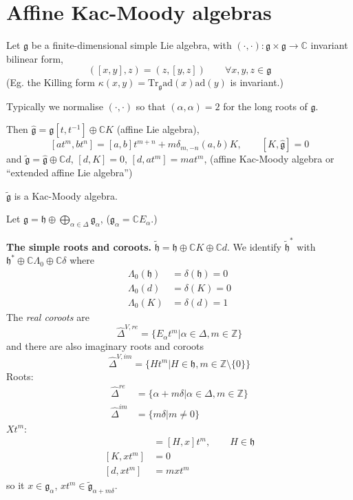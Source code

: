 \section{Affine Kac-Moody algebras}
\label{section-affine-Kac-Moody-algebras}

Let $\mathfrak{g}$ be a finite-dimensional simple Lie algebra, 
with $(\cdot,\cdot):\mathfrak{g} \times \mathfrak{g} \to \mathbb{C}$ 
invariant bilinear form,
$$
([x,y],z)=(z,[y,z])\qquad \forall x,y,z \in \mathfrak{g}
$$
(Eg. the Killing form  
$\kappa(x,y)=\text{Tr}_\mathfrak{g}\text{ad}(x)\text{ad}(y)$ is invariant.)

Typically we normalise $(\cdot,\cdot)$ so that $(\alpha,\alpha)=2$ for the long
roots of $\mathfrak{g}$.

Then $\hat{\mathfrak{g}}=\mathfrak{g}[t,t^{-1}]\oplus\mathbb{C}K$ 
(affine Lie algebra),
$$
[at^m,bt^n]=[a,b]t^{m+n}+m\delta_{m,-n}(a,b)K,\qquad [K,\hat{\mathfrak{g}}]=0
$$
and $\tilde{\mathfrak{g}}=\hat{\mathfrak{g}}\oplus\mathbb{C}d$, 
$[d,K]=0$,  $[d,at^m]=mat^m$, 
(affine Kac-Moody algebra or ``extended affine Lie algebra'')

\begin{theorem}
\label{theorem-gtilde-is-a-Kac-Moody-algebra}
$\tilde{\mathfrak{g}}$ is a Kac-Moody algebra.
\end{theorem}

Let $\mathfrak{g}=\mathfrak{h}\oplus \bigoplus_{\alpha \in
\Delta}\mathfrak{g}_\alpha$, ($\mathfrak{g}_\alpha=\mathbb{C}E_\alpha$.)

{\bf The simple roots and coroots.}
$\tilde{\mathfrak{h}}=\mathfrak{h}\oplus\mathbb{C}K\oplus\mathbb{C}d$. 
We identify $\tilde{\mathfrak{h}}^*$ with 
 $\mathfrak{h}^*\oplus\mathbb{C}\Lambda_0\oplus\mathbb{C}\delta$ where
\begin{align*}
\Lambda_0(\mathfrak{h})&=\delta(\mathfrak{h})=0\\
\Lambda_0(d)&=\delta(K)=0\\
\Lambda_0(K)&=\delta(d)=1
\end{align*}
The {\it real coroots} are
$$
\hat{\Delta}^{V,re}=\{E_\alpha t^m|\alpha \in \Delta, m \in \mathbb{Z}\}
$$
and there are also imaginary roots and coroots
$$
\hat{\Delta}^{V,im}=\{Ht^m|H \in \mathfrak{h}, m \in \mathbb{Z}\setminus\{0\}\}
$$
Roots:
\begin{align*}
\hat{\Delta}^{re}&=\{\alpha+m\delta|\alpha \in \Delta, m \in \mathbb{Z}\}\\
\hat{\Delta}^{im}&=\{m\delta|m \neq 0\}
\end{align*}
$Xt^m$:
\begin{align*}
[H,Xt^m]&=[H,x]t^m,\qquad H \in \mathfrak{h}\\
[K,xt^m]&=0\\
[d,xt^m]&=m x t^m
\end{align*}
so it $x \in \mathfrak{g}_\alpha$, $x t^m \in 
\tilde{\mathfrak{g}}_{\alpha+m\delta}$.

